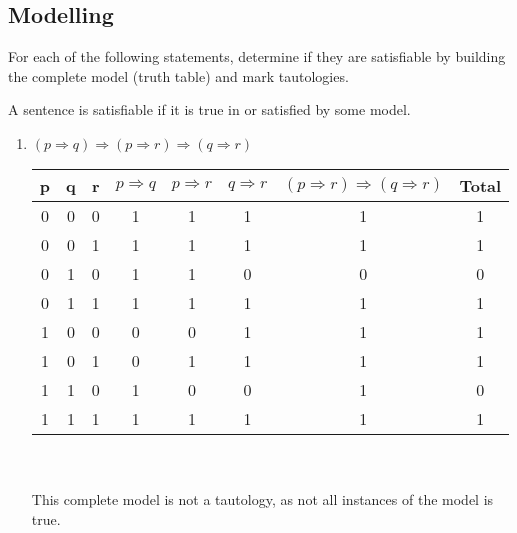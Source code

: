 \subsection{Modelling}
\begin{large}
  For each of the following statements, determine if they are satisfiable by building the complete model (truth table) and mark tautologies.

  A sentence is satisfiable if it is true in or satisfied by some model.

  \begin{enumerate}[label= (\alph*)]
    \item $ (p \Rightarrow q) \Rightarrow (p \Rightarrow r) \Rightarrow ( q \Rightarrow r ) $

          \begin{tabular}{c|c|c|c|c|c|c||c}
            p & q & r & $ p \Rightarrow q $ & $ p \Rightarrow r $ & $ q \Rightarrow r $ & $ (p \Rightarrow r) \Rightarrow ( q \Rightarrow r ) $ & Total \\
            \hline \hline
            0 & 0 & 0 & 1                   & 1                   & 1                   & 1                                                     & 1     \\
            \hline
            0 & 0 & 1 & 1                   & 1                   & 1                   & 1                                                     & 1     \\
            \hline
            0 & 1 & 0 & 1                   & 1                   & 0                   & 0                                                     & 0     \\
            \hline
            0 & 1 & 1 & 1                   & 1                   & 1                   & 1                                                     & 1     \\
            \hline
            1 & 0 & 0 & 0                   & 0                   & 1                   & 1                                                     & 1     \\
            \hline
            1 & 0 & 1 & 0                   & 1                   & 1                   & 1                                                     & 1     \\
            \hline
            1 & 1 & 0 & 1                   & 0                   & 0                   & 1                                                     & 0     \\
            \hline
            1 & 1 & 1 & 1                   & 1                   & 1                   & 1                                                     & 1     \\
            \hline
          \end{tabular}
          \\ \\
          This complete model is not a tautology, as not all instances of the model is true.


\end{enumerate}
\end{large}
